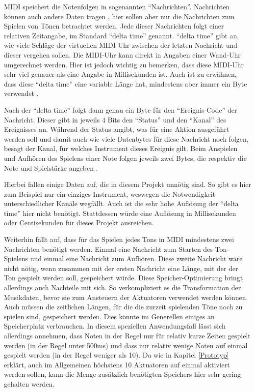 \ac{MIDI} speichert die Notenfolgen in sogenannten \enquote{Nachrichten}.
Nachrichten können auch andere Daten tragen \cite[siehe][für die gesamte Liste]{vm.SummaryMIDIMessages.20}, hier sollen aber nur die Nachrichten zum Spielen von Tönen betrachtet werden.
Jede dieser Nachrichten folgt einer relativen Zeitangabe, im Standard \enquote{delta time} genannt.
\enquote{delta time} gibt an, wie viele Schläge der virtuellen \ac{MIDI}-Uhr zwischen der letzten Nachricht und dieser vergehen sollen.
Die \ac{MIDI}-Uhr kann direkt in Angaben einer Wand-Uhr umgerechnet werden.
Hier ist jedoch wichtig zu bemerken, dass diese \ac{MIDI}-Uhr sehr viel genauer als eine Angabe in Millisekunden ist.
Auch ist zu erwähnen, dass diese \enquote{delta time} eine variable Länge hat, mindestens aber immer ein Byte verwendet \cite[vgl.][S. 135]{mid.CompleteMIDIDetailed.96}.

Nach der \enquote{delta time} folgt dann genau ein Byte für den \enquote{Ereignis-Code} der Nachricht.
Dieser gibt in jeweils 4 Bits den \enquote{Status} und den \enquote{Kanal} des Ereignisses an.
Während der Status angibt, was für eine Aktion ausgeführt werden soll und damit auch wie viele Datenbytes für diese Nachricht noch folgen, besagt der Kanal, für welches Instrument dieses Ereignis gilt.
Beim Anspielen und Aufhören des Spielens einer Note folgen jeweils zwei Bytes, die respektiv die Note und Spielstärke angeben \cite[vgl.][Kapitel 2]{van.MIDITutorialProgrammers.12}.

Hierbei fallen einige Daten auf, die in diesem Projekt unnötig sind.
So gibt es hier zum Beispiel nur ein einziges Instrument, weswegen die Notwendigkeit unterschiedlicher Kanäle wegfällt.
Auch ist die sehr hohe Auflösung der \enquote{delta time} hier nicht benötigt.
Stattdessen würde eine Auflösung in Millisekunden oder Centisekunden für dieses Projekt ausreichen.

Weiterhin fällt auf, dass für das Spielen jedes Tons in \ac{MIDI} mindestens zwei Nachrichten benötigt werden.
Einmal eine Nachricht zum Starten des Ton-Spielens und einmal eine Nachricht zum Aufhören.
Diese zweite Nachricht wäre nicht nötig, wenn zusammen mit der ersten Nachricht eine Länge, mit der der Ton gespielt werden soll, gespeichert würde.
Diese Speicher-Optimierung bringt allerdings auch Nachteile mit sich.
So verkompliziert es die Transformation der Musikdaten, bevor sie zum Ansteuern der Aktuatoren verwendet werden können.
Auch müssen die zeitlichen Längen, für die die zurzeit spielenden Töne noch zu spielen sind, gespeichert werden.
Dies könnte im Generellen einiges an Speicherplatz verbrauchen.
In diesem speziellen Anwendungsfall lässt sich allerdings annehmen, dass Noten in der Regel nur für relativ kurze Zeiten gespielt werden (in der Regel unter 500ms) und dass nur relativ wenige Noten auf einmal gespielt werden (in der Regel weniger als 10).
Da wie in Kapitel \ref{Prototyp} erklärt, auch im Allgemeinen höchstens 10 Aktuatoren auf einmal aktiviert werden sollen, kann die Menge zusätzlich benötigten Speichers hier sehr gering gehalten werden.

